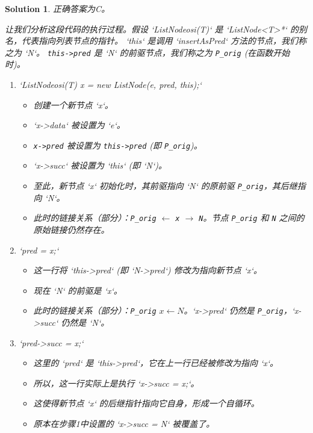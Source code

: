 \documentclass[UTF8]{report}
\newtheorem{solution}{Solution}
\theoremstyle{MyLineTheoremStyle} %
\theoremstyle{MyBlockTheoremStyle} %
\theoremstyle{MySubsubsectionStyle} %
\begin{document}
\begin{solution}
正确答案为C。

让我们分析这段代码的执行过程。假设 `ListNodeosi(T)` 是 `ListNode<T>*` 的别名，代表指向列表节点的指针。
`this` 是调用 `insertAsPred` 方法的节点，我们称之为 `N`。
\texttt{this->pred} 是 `N` 的前驱节点，我们称之为 \texttt{P\_orig} (在函数开始时)。

\begin{enumerate}
    \item `ListNodeosi(T) x = new ListNode(e, pred, this);`
    \begin{itemize}
        \item 创建一个新节点 `x`。
        \item `x->data` 被设置为 `e`。
        \item \texttt{x->pred} 被设置为 \texttt{this->pred} (即 \texttt{P\_orig})。
        \item `x->succ` 被设置为 `this` (即 `N`)。
        \item 至此，新节点 `x` 初始化时，其前驱指向 `N` 的原前驱 \texttt{P\_orig}，其后继指向 `N`。
        \item 此时的链接关系（部分）：\texttt{P\_orig} $\leftarrow$ \texttt{x} $\rightarrow$ \texttt{N}。节点 \texttt{P\_orig} 和 \texttt{N} 之间的原始链接仍然存在。
    \end{itemize}

    \item `pred = x;`
    \begin{itemize}
        \item 这一行将 `this->pred` (即 `N->pred`) 修改为指向新节点 `x`。
        \item 现在 `N` 的前驱是 `x`。
        \item 此时的链接关系（部分）：\texttt{P\_orig} \quad $x \leftarrow N$。`x->pred` 仍然是 \texttt{P\_orig}，`x->succ` 仍然是 `N`。
    \end{itemize}

    \item `pred->succ = x;`
    \begin{itemize}
        \item 这里的 `pred` 是 `this->pred`，它在上一行已经被修改为指向 `x`。
        \item 所以，这一行实际上是执行 `x->succ = x;`。
        \item 这使得新节点 `x` 的后继指针指向它自身，形成一个自循环。
        \item 原本在步骤1中设置的 `x->succ = N` 被覆盖了。
    \end{itemize}
\end{enumerate}


\end{solution}
\end{document}
